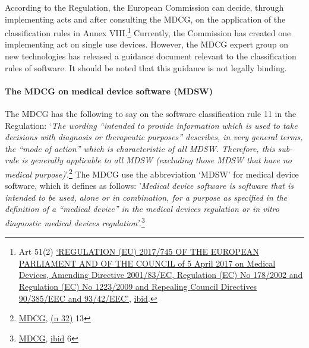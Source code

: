\documentclass[
]{scrartcl}
\begin{document}
According to the Regulation, the European Commission can decide, through implementing acts and after consulting the MDCG, on the application of the classification rules in Annex VIII.\footnote{Art 51(2) \protect\hyperlink{ref-REGULATIONEU2017a}{{`{REGULATION} ({EU}) 2017/745 {OF THE EUROPEAN PARLIAMENT AND OF THE COUNCIL} of 5 {April} 2017 on Medical Devices, Amending {Directive} 2001/83/{EC}, {Regulation} ({EC}) {No} 178/2002 and {Regulation} ({EC}) {No} 1223/2009 and Repealing {Council Directives} 90/385/{EEC} and 93/42/{EEC}'}}, \protect\hyperlink{ref-REGULATIONEU2017a}{ibid}.} Currently, the Commission has created one implementing act on single use devices. However, the MDCG expert group on new technologies has released a guidance document relevant to the classification rules of software. It should be noted that this guidance is not legally binding.

\hypertarget{the-mdcg-on-medical-device-software-mdsw}{%
\paragraph{The MDCG on medical device software (MDSW)}\label{the-mdcg-on-medical-device-software-mdsw}}

The MDCG has the following to say on the software classification rule 11 in the Regulation: `\emph{The wording ``intended to provide information which is used to take decisions with diagnosis or therapeutic purposes'' describes, in very general terms, the ``mode of action'' which is characteristic of all MDSW. Therefore, this sub-rule is generally applicable to all MDSW (excluding those MDSW that have no medical purpose)}'.\footnote{\protect\hyperlink{ref-mdcgGuidanceClinicalEvaluation2020}{MDCG}, \protect\hyperlink{ref-mdcgGuidanceClinicalEvaluation2020}{(n 32)} 13} The MDCG use the abbreviation `MDSW' for medical device software, which it defines as follows: '\emph{Medical device software is software that is intended to be used, alone or in combination, for a purpose as specified in the definition of a ``medical device'' in the medical devices regulation or in vitro diagnostic medical devices regulation'}.\footnote{\protect\hyperlink{ref-mdcgGuidanceClinicalEvaluation2020}{MDCG}, \protect\hyperlink{ref-mdcgGuidanceClinicalEvaluation2020}{ibid} 6}
\end{document}
